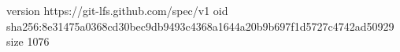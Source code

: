 version https://git-lfs.github.com/spec/v1
oid sha256:8e31475a0368cd30bec9db9493c4368a1644a20b9b697f1d5727c4742ad50929
size 1076
